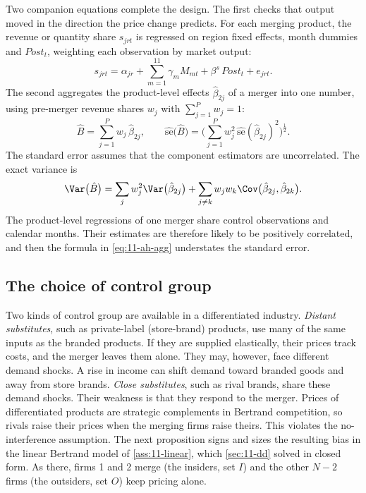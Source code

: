 Two companion equations complete the design. The first checks that output moved in the direction the price
change predicts. For each merging product, the revenue or quantity share $s_{jrt}$ is regressed on region fixed
effects, month dummies and $\mathit{Post}_t$, weighting each observation by market output:
\begin{equation}\label{eq:11-ah-share}
s_{jrt}=\alpha_{jr}+\sum_{m=1}^{11}\gamma_m M_{mt}+\beta^{s}\,\mathit{Post}_t+e_{jrt}.
\end{equation}
The second aggregates the product-level effects $\hat\beta_{2j}$ of a merger into one number, using pre-merger
revenue shares $w_j$ with $\sum_{j=1}^{P}w_j=1$:
\begin{equation}\label{eq:11-ah-agg}
\hat B=\sum_{j=1}^{P}w_j\,\hat\beta_{2j},\qquad
\widehat{\mathrm{se}}\big(\hat B\big)=\Big(\sum_{j=1}^{P}w_j^2\,\widehat{\mathrm{se}}(\hat\beta_{2j})^2\Big)^{\frac{1}{2}}.
\end{equation}
The standard error assumes that the component estimators are uncorrelated. The exact variance is
\begin{equation*}
\Var\big(\hat B\big)=\sum_{j}w_j^2\Var\big(\hat\beta_{2j}\big)+\sum_{j\neq k}w_jw_k\Cov\big(\hat\beta_{2j},\hat\beta_{2k}\big).
\end{equation*}
The product-level regressions of one merger share control observations and calendar months. Their estimates are
therefore likely to be positively correlated, and then the formula in \eqref{eq:11-ah-agg} understates the
standard error.

\subsection{The choice of control group}\label{sec:11-retro-control}

Two kinds of control group are available in a differentiated industry. \emph{Distant substitutes}, such as
private-label (store-brand) products, use many of the same inputs as the branded products. If they are supplied
elastically, their prices track costs, and the merger leaves them alone. They may, however, face different demand
shocks. A rise in income can shift demand toward branded goods and away from store brands. \emph{Close
substitutes}, such as rival brands, share these demand shocks. Their weakness is that they respond to the
merger. Prices of differentiated products are strategic complements in Bertrand competition, so rivals raise
their prices when the merging firms raise theirs. This violates the no-interference assumption. The next
proposition signs and sizes the resulting bias in the linear Bertrand model of \cref{ass:11-linear}, which
\cref{sec:11-dd} solved in closed form. As there, firms 1 and 2 merge (the insiders, set $I$) and the other $N-2$
firms (the outsiders, set $O$) keep pricing alone.

